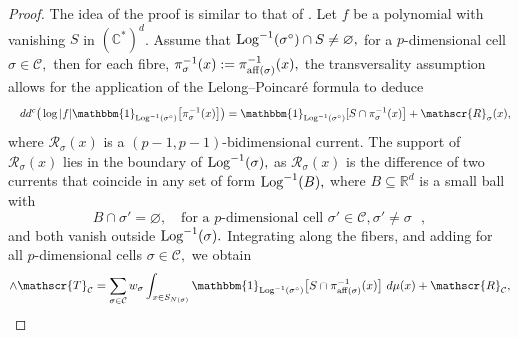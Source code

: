 \documentclass[11pt]{amsart}
\def\Log{{\rm Log}}
\def\aff{{\rm aff}}
\theoremstyle{definition}
\newcommand{\R}{\mathbb{R}}
\newcommand{\CC}{\mathbb{C}}
\newcommand{\C}{\mathbb{C}}
\newcommand{\cC}{\mathcal{C}}
\newcommand{\sT}{\mathscr{T}}
\newcommand{\sR}{\mathscr{R}}
\begin{document}
\begin{proof} 
The idea of the proof is similar to that of \cite[Proposition 4.11]{BH}. Let $f$ be a polynomial with vanishing $S$ in $(\CC^*)^d$. Assume that $\Log^{-1}(\sigma^{\circ})\cap S \neq \varnothing,$ for a $p$-dimensional cell $\sigma \in \cC,$ then for each fibre, $\pi_{\sigma}^{-1}(x):= \pi_{\aff(\sigma)}^{-1}(x),$ the transversality assumption allows for the application of the Lelong--Poincar\'e formula to deduce
$$
    \quad dd^c \big(\log|f|\mathbbm{1}_{\Log^{-1}(\sigma^{\circ})}\big[\pi^{-1}_{\sigma}(x) \big] \big)  = \mathbbm{1}_{\Log^{-1}(\sigma^{\circ})} [ S \cap \pi^{-1}_{\sigma}(x) \big] + \sR_{\sigma}(x), 
$$
where $\sR_{\sigma}(x)$ is a $(p-1, p-1)$-bidimensional current. The support of $\sR_{\sigma}(x)$ lies in the boundary of $\Log^{-1}(\sigma),$ as $\sR_{\sigma}(x)$ is the difference of two currents that coincide in any set of form $ \Log^{-1}(B),$ where $B\subseteq \R^d$ is a small ball with
  $$
  B\cap \sigma' = \varnothing, \quad \text{for a $p$-dimensional cell  $\sigma'\in \cC, \sigma'\neq \sigma$ },
  $$
and both vanish outside $\Log^{-1}(\sigma).$
Integrating along the fibers, and adding for all $p$-dimensional cells $\sigma \in \cC,$ we obtain
\begin{equation*}
[S] \wedge {\sT_{\cC}}  = \sum_{\sigma \in \cC} w_{\sigma}\int_{ x \in S_{N(\sigma)}} \mathbbm{1}_{\Log^{-1}(\sigma^{\circ})} \big[ S \cap \pi_{\mathrm{aff}(\sigma)}^{-1}(x) \big] \ d\mu(x) + \sR_{\cC},
\end{equation*}

\end{proof}
\end{document}

